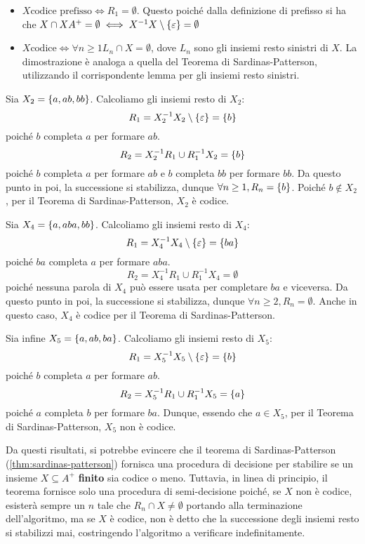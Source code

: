 \begin{note}[Osservazioni]
  \begin{itemize}
    \item \(X \text{codice prefisso} \iff R_1 = \emptyset\).
      Questo poiché dalla definizione di prefisso si ha che \(X \cap XA^+ = \emptyset \iff X^{-1}X \setminus \set{\varepsilon} = \emptyset\)
    \item \(X \text{codice} \iff \forall n \geq 1 L_n \cap X = \emptyset\),
      dove \(L_n\) sono gli insiemi resto sinistri di \(X\).
      La dimostrazione è analoga a quella del Teorema di Sardinas-Patterson, utilizzando il corrispondente lemma per gli insiemi resto sinistri.
  \end{itemize}
\end{note}

\begin{example}
  Sia \(X_2 = \set{a,ab,bb}\). Calcoliamo gli insiemi resto di \(X_2\):
  \[R_1 = X_2^{-1}X_2 \setminus \set{\varepsilon} = \set{b}\]
  poiché \(b\) completa \(a\) per formare \(ab\).
  \[R_2 = X_2^{-1}R_1 \cup R_1^{-1}X_2 = \set{b}\]
  poiché \(b\) completa \(a\) per formare \(ab\) e \(b\) completa \(bb\) per formare \(bb\).
  Da questo punto in poi, la successione si stabilizza, dunque \(\forall n \geq 1, R_n = \set{b}\).
  Poiché \(b \not\in X_2\), per il Teorema di Sardinas-Patterson, \(X_2\) è codice.

  Sia \(X_4 = \set{a,aba,bb}\). Calcoliamo gli insiemi resto di \(X_4\):
  \[R_1 = X_4^{-1}X_4 \setminus \set{\varepsilon} = \set{ba}\]
  poiché \(ba\) completa \(a\) per formare \(aba\).
  \[R_2 = X_4^{-1}R_1 \cup R_1^{-1}X_4 = \emptyset\]
  poiché nessuna parola di \(X_4\) può essere usata per completare \(ba\) e viceversa.
  Da questo punto in poi, la successione si stabilizza, dunque \(\forall n \geq 2, R_n = \emptyset\).
  Anche in questo caso, \(X_4\) è codice per il Teorema di Sardinas-Patterson.

  Sia infine \(X_5 = \set{a,ab,ba}\). Calcoliamo gli insiemi resto di \(X_5\):
  \[R_1 = X_5^{-1}X_5 \setminus \set{\varepsilon} = \set{b}\]
  poiché \(b\) completa \(a\) per formare \(ab\).
  \[R_2 = X_5^{-1}R_1 \cup R_1^{-1}X_5 = \set{a}\]
  poiché \(a\) completa \(b\) per formare \(ba\).
  Dunque, essendo che \(a \in X_5\), per il Teorema di Sardinas-Patterson, \(X_5\) non è codice.
\end{example}

Da questi risultati, si potrebbe evincere che il teorema di Sardinas-Patterson (\ref{thm:sardinas-patterson}) fornisca una procedura di decisione per stabilire se un insieme \(X \subseteq A^+\) \textbf{finito} sia codice o meno.
Tuttavia, in linea di principio, il teorema fornisce solo una procedura di semi-decisione poiché, se \(X\) non è codice, esisterà sempre un \(n\) tale che \(R_n \cap X \neq \emptyset\) portando alla terminazione dell'algoritmo, ma se \(X\) è codice, non è detto che la successione degli insiemi resto si stabilizzi mai, costringendo l'algoritmo a verificare indefinitamente.

